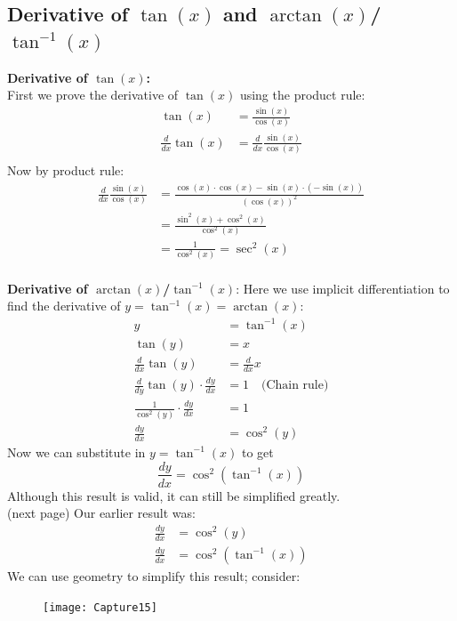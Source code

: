 \documentclass{report}
\begin{document}
\subsection{Derivative of $\tan(x)$ and $\arctan(x)$/$\tan^{-1}(x)$} %
\textbf{Derivative of $\tan(x)$:}\\
First we prove the derivative of $\tan(x)$ using the product rule:
\begin{align*}
\tan(x)&=\frac{\sin(x)}{\cos(x)}\\
\frac{d}{dx}\tan(x)&=\frac{d}{dx}\frac{\sin(x)}{\cos(x)}\\
\end{align*}
Now by product rule:
\begin{align*}
\frac{d}{dx}\frac{\sin(x)}{\cos(x)}&=\frac{\cos(x)\cdot\cos(x)
-\sin(x)\cdot(-\sin(x))}{(\cos(x))^{2}}\\
&=\frac{\sin^2(x)+\cos^2(x)}{\cos^2(x)}\\
&=\frac{1}{\cos^2(x)}=\sec^2(x)
\end{align*}
\vspace{2mm}\\
\textbf{Derivative of $\arctan(x)$/$\tan^{-1}(x)$}:
Here we use implicit differentiation to find the derivative of $y=\tan^{-1}(x)=\arctan(x)$:
\begin{align*}
y&=\tan^{-1}(x)\\
\tan(y)&=x\\
\frac{d}{dx}\tan(y)&=\frac{d}{dx}x\\
\frac{d}{dy}\tan(y)\cdot\frac{dy}{dx}&=1\quad\text{(Chain rule)}\\
\frac{1}{\cos^2(y)}\cdot\frac{dy}{dx}&=1\\
\frac{dy}{dx}&=\cos^2(y)
\end{align*}
Now we can substitute in $y=\tan^{-1}(x)$ to get
\begin{equation*}
\frac{dy}{dx}=\cos^2(\tan^{-1}(x))
\end{equation*}
Although this result is valid, it can still be simplified greatly.\\
(next page)
\newpage
\noindent Our earlier result was:
\begin{align*}
\frac{dy}{dx}&=\cos^2(y)\\
\frac{dy}{dx}&=\cos^2(\tan^{-1}(x))
\end{align*}
We can use geometry to simplify this result; consider:
\begin{figure}[h]
\texttt{[image: Capture15]}\\
\centering
{}
\end{figure}\\
\end{document}
